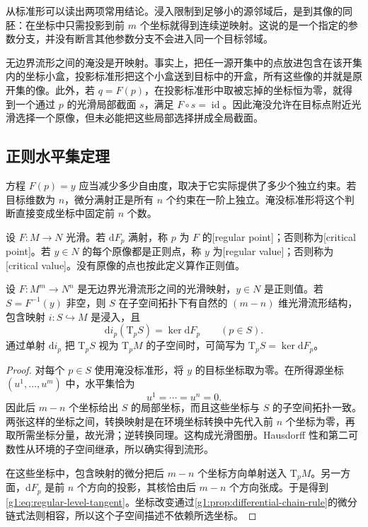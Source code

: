 从标准形可以读出两项常用结论。浸入限制到足够小的源邻域后，是到其像的同胚：在坐标中只需投影到前 \(m\) 个坐标就得到连续逆映射。这说的是一个指定的参数分支，并没有断言其他参数分支不会进入同一个目标邻域。

\ProseParagraphBreak

无边界流形之间的淹没是开映射。事实上，把任一源开集中的点放进包含在该开集内的坐标小盒，投影标准形把这个小盒送到目标中的开盒，所有这些像的并就是原开集的像。此外，若 \(q=F(p)\)，在投影标准形中取被忘掉的坐标恒为零，就得到一个通过 \(p\) 的光滑局部截面 \(s\)，满足 \(F\circ s=\operatorname{id}\)。因此淹没允许在目标点附近光滑选择一个原像，但未必能把这些局部选择拼成全局截面。

\subsection{正则水平集定理}
\label{g1:subsec:1104:02}

方程 \(F(p)=y\) 应当减少多少自由度，取决于它实际提供了多少个独立约束。若目标维数为 \(n\)，微分满射正是所有 \(n\) 个约束在一阶上独立。淹没标准形将这个判断直接变成坐标中固定前 \(n\) 个数。

\begin{definition}\label{g1:def:regular-value}
	设 \(F:M\to N\) 光滑。若 \(\mathrm{d}F_p\) 满射，称 \(p\) 为 \(F\) 的[regular point]；否则称为[critical point]。若 \(y\in N\) 的每个原像都是正则点，称 \(y\) 为[regular value]；否则称为[critical value]。没有原像的点也按此定义算作正则值。
\end{definition}

\begin{theorem}\label{g1:thm:regular-level-set}
	设 \(F:M^m\to N^n\) 是无边界光滑流形之间的光滑映射，\(y\in N\) 是正则值。若 \(S=F^{-1}(y)\) 非空，则 \(S\) 在子空间拓扑下有自然的 \((m-n)\) 维光滑流形结构，包含映射 \(i:S\hookrightarrow M\) 是浸入，且
	\begin{equation}\label{g1:eq:regular-level-tangent}
		\mathrm{d}i_p(\mathrm{T}_pS)=\ker\mathrm{d}F_p\qquad(p\in S).
	\end{equation}
	通过单射 \(\mathrm{d}i_p\) 把 \(\mathrm{T}_pS\) 视为 \(\mathrm{T}_pM\) 的子空间时，可简写为 \(\mathrm{T}_pS=\ker\mathrm{d}F_p\)。
\end{theorem}
\begin{proof}
	对每个 \(p\in S\) 使用淹没标准形，将 \(y\) 的目标坐标取为零。在所得源坐标 \((u^1,\ldots,u^m)\) 中，水平集恰为
	\[
		u^1=\cdots=u^n=0.
	\]
	因此后 \(m-n\) 个坐标给出 \(S\) 的局部坐标，而且这些坐标与 \(S\) 的子空间拓扑一致。两张这样的坐标之间，转换映射是在环境坐标转换中先代入前 \(n\) 个坐标为零，再取所需坐标分量，故光滑；逆转换同理。这构成光滑图册。Hausdorff 性和第二可数性从环境的子空间继承，所以确实得到流形。

	在这些坐标中，包含映射的微分把后 \(m-n\) 个坐标方向单射送入 \(\mathrm{T}_pM\)。另一方面，\(\mathrm{d}F_p\) 是前 \(n\) 个方向的投影，其核恰由后 \(m-n\) 个方向张成。于是得到\eqref{g1:eq:regular-level-tangent}。坐标改变通过\cref{g1:prop:differential-chain-rule}的微分链式法则相容，所以这个子空间描述不依赖所选坐标。
\end{proof}

